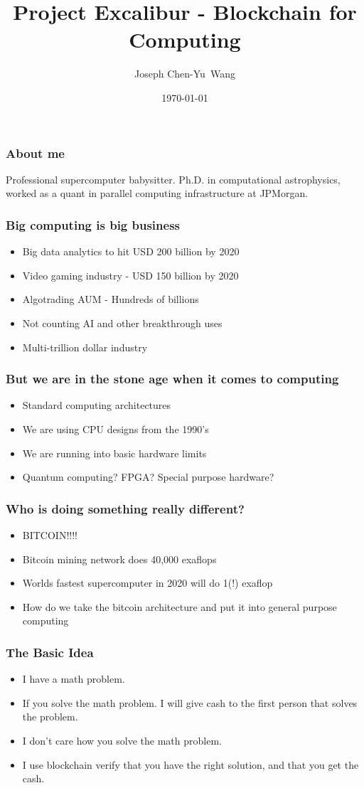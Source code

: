 \documentclass{beamer}
\title {Project Excalibur - Blockchain for Computing}
\author{Joseph Chen-Yu~Wang}
\institute{Bitquant Research Laboratories (Asia) Limited\\
  in association with the Banzai Institute of Advanced Research\\
  and the Hong Kong Caviliers}
\date{\today}
\begin{document}
\frame{\titlepage}
\begin{frame}
  \frametitle{About me}
Professional supercomputer babysitter.  Ph.D. in computational
astrophysics, worked as a quant in parallel computing 
infrastructure at JPMorgan.
\end{frame}
\begin{frame}
  \frametitle{Big computing is big business}
  \begin{itemize}
  \item Big data analytics to hit USD 200 billion by 2020
  \item Video gaming industry - USD 150 billion by 2020
  \item Algotrading AUM - Hundreds of billions
  \item Not counting AI and other breakthrough uses
  \item Multi-trillion dollar industry
  \end{itemize}
\end{frame}
\begin{frame}
  \frametitle{But we are in the stone age when it comes to computing}
  \begin{itemize}
  \item Standard computing architectures
  \item We are using CPU designs from the 1990's
  \item We are running into basic hardware limits
  \item Quantum computing?  FPGA? Special purpose hardware?
  \end{itemize}
\end{frame} 
\begin{frame}
  \frametitle{Who is doing something really different?}
  \begin{itemize}
  \item BITCOIN!!!!
  \item Bitcoin mining network does 40,000 exaflops
  \item Worlds fastest supercomputer in 2020 will do 1(!) exaflop
  \item How do we take the bitcoin architecture and put it into
    general purpose computing
  \end{itemize}
\end{frame}
\begin{frame}
  \frametitle{The Basic Idea}
  \begin{itemize}
  \item I have a math problem.
  \item If you solve the math problem.  I will give cash to the first
    person that solves the problem.
  \item I don't care how you solve the math problem.
  \item I use blockchain verify that you have the right
    solution, and that you get the cash.
  \end{itemize}
\end{frame}
\end{document}
